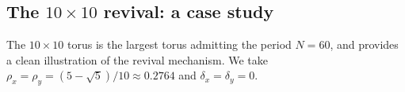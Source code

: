 \subsection{The $10 \times 10$ revival: a case study}
The $10 \times 10$ torus is the largest torus admitting the
period $N = 60$, and provides a clean illustration
of the revival mechanism. We take $\rho_x = \rho_y =
(5 - \sqrt{5})/10 \approx 0.2764$ and $\delta_x =
\delta_y = 0$.
